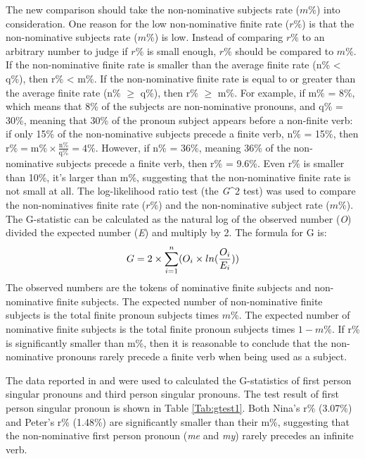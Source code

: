 The new comparison should take the non-nominative subjects rate ($m\%$) into consideration. One reason for the low non-nominative finite rate ($r\%$) is that the non-nominative subjects rate ($m\%$) is low. Instead of comparing $r\%$ to an arbitrary number to judge if $r\%$ is small enough, $r\%$ should be compared to $m\%$. If the non-nominative finite rate is smaller than the average finite rate (n\% < q\%), then r\% < m\%. If the non-nominative finite rate is equal to or greater than the average finite rate (n\% $\geq$ q\%), then r\% $\geq$ m\%. For example, if m\% = 8\%, which means that 8\% of the subjects are non-nominative pronouns, and q\% = 30\%, meaning that 30\% of the pronoun subject appears before a non-finite verb: if only 15\% of the non-nominative subjects precede a finite verb, n\% = 15\%, then $\text{r\%} = \text{m\%} \times \displaystyle\frac{\text{n\%}}{\text{q\%}} = 4\%$. However, if n\% = 36\%, meaning 36\% of the non-nominative subjects precede a finite verb, then r\% = 9.6\%. Even r\% is smaller than 10\%, it's larger than m\%, suggesting that the non-nominative finite rate is not small at all. The log-likelihood ratio test (the \textit{G}^2 test) was used to compare the non-nominatives finite rate ($r\%$) and the non-nominative subject rate ($m\%$). The G-statistic can be calculated as the natural log of the observed number (\textit{O}) divided the expected number (\textit{E}) and multiply by 2.   The formula for G is:
\begin{equation}
    \centering
    G = 2 \times \displaystyle\sum_{i = 1}^{n}(O_i \times ln(\displaystyle\frac{\text{$O_i$}}{\text{$E_i$}}))
\end{equation}
The observed numbers are the tokens of nominative finite subjects and non-nominative finite subjects. The expected number of non-nominative finite subjects is the total finite pronoun subjects times $m\%$. The expected number of nominative finite subjects is the total finite pronoun subjects times $1-m\%$. If r\% is significantly smaller than m\%, then it is reasonable to conclude that the non-nominative pronouns rarely precede a finite verb when being used as a subject. 

The data reported in \cite{schutze1997} and \cite{pine2005testing} were used to calculated the G-statistics of first person singular pronouns and third person singular pronouns. The test result of first person singular pronoun is shown in Table \ref{Tab:gtest1}. Both Nina's r\% (3.07\%) and Peter's r\% (1.48\%) are significantly smaller than their m\%, suggesting that the non-nominative first person pronoun (\textit{me} and \textit{my}) rarely precedes an infinite verb. 

